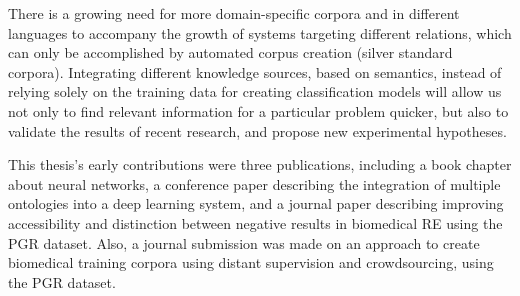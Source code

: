 There is a growing need for more domain-specific corpora and in different languages to accompany the growth of systems targeting different relations, which can only be accomplished by automated corpus creation (silver standard corpora). Integrating different knowledge sources, based on semantics, instead of relying solely on the training data for creating classification models will allow us not only to find relevant information for a particular problem quicker, but also to validate the results of recent research, and propose new experimental hypotheses.

This thesis's early contributions were three publications, including a book chapter about neural networks, a conference paper describing the integration of multiple ontologies into a deep learning system, and a journal paper describing improving accessibility and distinction between negative results in biomedical RE using the PGR dataset. Also, a journal submission was made on an approach to create biomedical training corpora using distant supervision and crowdsourcing, using the PGR dataset.
